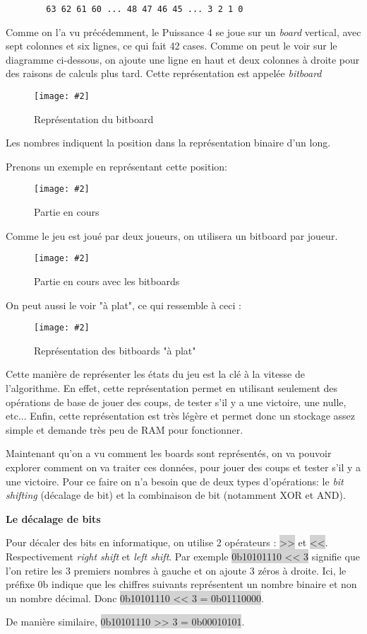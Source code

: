 \documentclass[a4paper]{article}
\newcommand{\img}[3][]{
    \begin{figure}[H]
        \centering
        \texttt{[image: \#2]}
        \caption{#1}    
    \end{figure}
}
\newcommand{\inlinecode}[1]{\colorbox{lightgray}{#1}}
\newcommand{\ptitle}[1]{\vspace{10pt}
{\large \noindent \textbf{#1}}}
\begin{document}
    \begin{lstlisting}
        63 62 61 60 ... 48 47 46 45 ... 3 2 1 0
    \end{lstlisting}
    
    Comme on l'a vu précédemment, le Puissance 4 se joue sur un \textit{board} vertical, avec sept colonnes et six lignes, ce qui fait 42 cases. Comme on peut le voir sur le diagramme ci-dessous, on ajoute une ligne en haut et deux colonnes à droite pour des raisons de calculs plus tard. Cette représentation est appelée \textit{bitboard}
    \img[Représentation du bitboard]{Images/BitBoard.png}{0.7}
    Les nombres indiquent la position dans la représentation binaire d'un long.

    Prenons un exemple en représentant cette position:
    \img[Partie en cours]{Images/ExempleBitBoardsPt1.png}{0.3}

    Comme le jeu est joué par deux joueurs, on utilisera un bitboard par joueur.
    \img[Partie en cours avec les bitboards]{Images/ExempleBitBoardsPt2.png}{0.7}
    On peut aussi le voir "à plat", ce qui ressemble à ceci :
    \img[Représentation des bitboards "à plat"]{Images/FlatBiboard.png}{1}

    Cette manière de représenter les états du jeu est la clé à la vitesse de l'algorithme. En effet, cette représentation permet en utilisant seulement des opérations de base de jouer des coups, de tester s'il y a une victoire, une nulle, etc... Enfin, cette représentation est très légère et permet donc un stockage assez simple et demande très peu de RAM pour fonctionner.

    Maintenant qu'on a vu comment les boards sont représentés, on va pouvoir explorer comment on va traiter ces données, pour jouer des coups et tester s'il y a une victoire. Pour ce faire on n'a besoin que de deux types d'opérations: le \textit{bit shifting} (décalage de bit) et la combinaison de bit (notamment XOR et AND).

    \ptitle{Le décalage de bits}

    Pour décaler des bits en informatique, on utilise 2 opérateurs : \inlinecode{>>} et \inlinecode{<<}. Respectivement \textit{right shift} et \textit{left shift}. Par exemple \inlinecode{0b10101110 << 3} signifie que l'on retire les 3 premiers nombres à gauche et on ajoute 3 zéros à droite. Ici, le préfixe 0b indique que les chiffres suivants représentent un nombre binaire et non un nombre décimal. Donc \inlinecode{0b10101110 << 3 = 0b01110000}.
   
    De manière similaire, \inlinecode{0b10101110 >> 3 = 0b00010101}.
\end{document}
